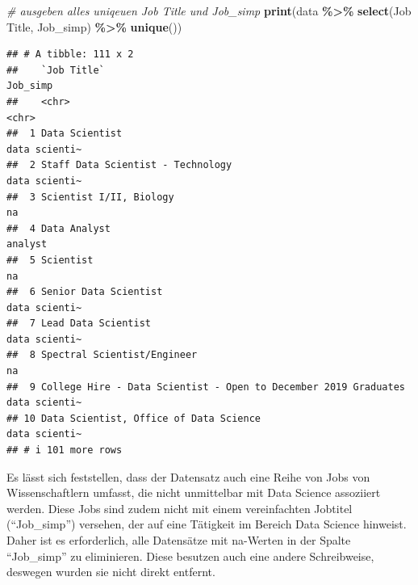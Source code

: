 \documentclass[
]{article}
\newenvironment{Shaded}{\begin{snugshade}}{\end{snugshade}}
\newcommand{\AttributeTok}[1]{\textcolor[rgb]{0.13,0.29,0.53}{#1}}
\newcommand{\CommentTok}[1]{\textcolor[rgb]{0.56,0.35,0.01}{\textit{#1}}}
\newcommand{\FunctionTok}[1]{\textcolor[rgb]{0.13,0.29,0.53}{\textbf{#1}}}
\newcommand{\NormalTok}[1]{#1}
\newcommand{\SpecialCharTok}[1]{\textcolor[rgb]{0.81,0.36,0.00}{\textbf{#1}}}
\newcommand{\StringTok}[1]{\textcolor[rgb]{0.31,0.60,0.02}{#1}}
\begin{document}
\begin{Shaded}
\begin{Highlighting}[]
\CommentTok{\# ausgeben alles uniqeuen Job Title und Job\_simp}
\FunctionTok{print}\NormalTok{(data }\SpecialCharTok{\%\textgreater{}\%} \FunctionTok{select}\NormalTok{(}\StringTok{\textasciigrave{}}\AttributeTok{Job Title}\StringTok{\textasciigrave{}}\NormalTok{, }\StringTok{\textasciigrave{}}\AttributeTok{Job\_simp}\StringTok{\textasciigrave{}}\NormalTok{) }\SpecialCharTok{\%\textgreater{}\%} \FunctionTok{unique}\NormalTok{())}
\end{Highlighting}
\end{Shaded}

\begin{verbatim}
## # A tibble: 111 x 2
##    `Job Title`                                                     Job_simp     
##    <chr>                                                           <chr>        
##  1 Data Scientist                                                  data scienti~
##  2 Staff Data Scientist - Technology                               data scienti~
##  3 Scientist I/II, Biology                                         na           
##  4 Data Analyst                                                    analyst      
##  5 Scientist                                                       na           
##  6 Senior Data Scientist                                           data scienti~
##  7 Lead Data Scientist                                             data scienti~
##  8 Spectral Scientist/Engineer                                     na           
##  9 College Hire - Data Scientist - Open to December 2019 Graduates data scienti~
## 10 Data Scientist, Office of Data Science                          data scienti~
## # i 101 more rows
\end{verbatim}

Es lässt sich feststellen, dass der Datensatz auch eine Reihe von Jobs
von Wissenschaftlern umfasst, die nicht unmittelbar mit Data Science
assoziiert werden. Diese Jobs sind zudem nicht mit einem vereinfachten
Jobtitel (``Job\_simp'') versehen, der auf eine Tätigkeit im Bereich
Data Science hinweist. Daher ist es erforderlich, alle Datensätze mit
na-Werten in der Spalte ``Job\_simp'' zu eliminieren. Diese besutzen
auch eine andere Schreibweise, deswegen wurden sie nicht direkt
entfernt.
\end{document}
